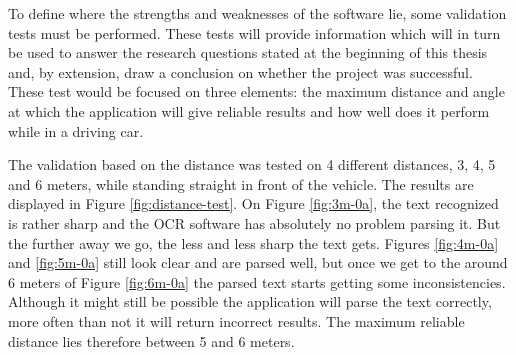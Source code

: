 To define where the strengths and weaknesses of the software lie, some validation tests must be performed. These tests will provide information which will in turn be used to answer the research questions stated at the beginning of this thesis and, by extension, draw a conclusion on whether the project was successful. These test would be focused on three elements: the maximum distance and angle at which the application will give reliable results and how well does it perform while in a driving car.

%

The validation based on the distance was tested on 4 different distances, 3, 4, 5 and 6 meters, while standing straight in front of the vehicle. The results are displayed in Figure \ref{fig:distance-test}. On Figure \ref{fig:3m-0a}, the text recognized is rather sharp and the OCR software has absolutely no problem parsing it. But the further away we go, the less and less sharp the text gets. Figures \ref{fig:4m-0a} and \ref{fig:5m-0a} still look clear and are parsed well, but once we get to the around 6 meters of Figure \ref{fig:6m-0a} the parsed text starts getting some inconsistencies. Although it might still be possible the application will parse the text correctly, more often than not it will return incorrect results. The maximum reliable distance lies therefore between 5 and 6 meters. %


